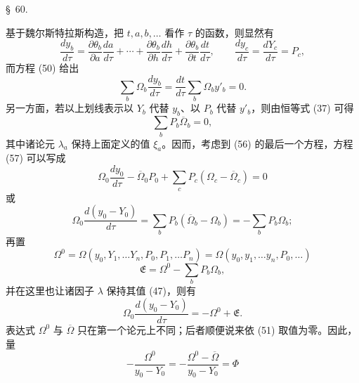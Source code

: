 \documentclass[11pt,a4paper,leqno]{article}
\begin{document}
\begin{center}
{\large \S~60.}
\end{center}

基于魏尔斯特拉斯构造，把
$t,a,b,\ldots$ 看作 $\tau$ 的函数，则显然有
\begin{equation}\tag{56}
\frac{dy_b}{d\tau}
=\frac{\partial\theta_b}{\partial a}\frac{da}{d\tau}
+\cdots+
\frac{\partial\theta_b}{\partial h}\frac{dh}{d\tau}
+\frac{\partial\theta_b}{\partial t}\frac{dt}{d\tau},\qquad
\frac{dy_c}{d\tau}=\frac{dY_c}{d\tau}=P_c,
\end{equation}
而方程 (50) 给出
\begin{equation}\tag{57}
\sum_b\Omega_b\frac{dy_b}{d\tau}
=\frac{dt}{d\tau}\sum_b\Omega_b y'_b=0.
\end{equation}
另一方面，若以上划线表示以 $Y_b$ 代替 $y_b$、以 $P_b$ 代替
$y'_b$，则由恒等式 (37) 可得
\[
\sum_b P_b\overline{\Omega}_b=0,
\]
其中诸论元 $\lambda_a$ 保持上面定义的值 $\xi_a$。因而，考虑到
(56) 的最后一个方程，方程 (57) 可以写成
\[
\Omega_0\frac{dy_0}{d\tau}-\overline{\Omega}_0P_0
+\sum_c P_c(\Omega_c-\overline{\Omega}_c)=0
\]
或
\[
\Omega_0\frac{d(y_0-Y_0)}{d\tau}
=\sum_b P_b(\overline{\Omega}_b-\Omega_b)
=-\sum_b P_b\Omega_b;
\]
再置
\[
\Omega^0=\Omega(y_0,Y_1,\ldots Y_n,P_0,P_1,\ldots P_n)
=\Omega(y_0,y_1,\ldots y_n,P_0,\ldots)
\]
\[
\mathfrak{E}=\Omega^0-\sum_b P_b\Omega_b,
\]
并在这里也让诸因子 $\lambda$ 保持其值 (47)，则有
\begin{equation}\tag{58}
\Omega_0\frac{d(y_0-Y_0)}{d\tau}=-\Omega^0+\mathfrak{E}.
\end{equation}
表达式 $\Omega^0$ 与 $\overline{\Omega}$ 只在第一个论元上不同；后者顺便说来依
(51) 取值为零。因此，量
\[
-\frac{\Omega^0}{y_0-Y_0}
=-\frac{\Omega^0-\overline{\Omega}}{y_0-Y_0}=\Phi
\]
\end{document}
